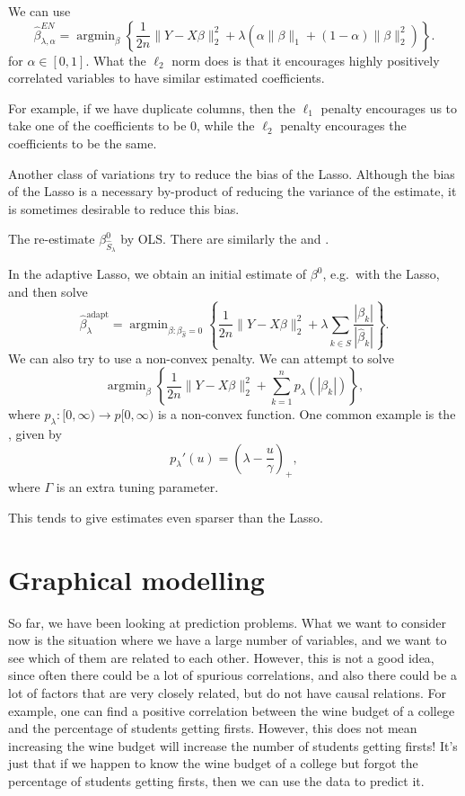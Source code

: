 \documentclass[a4paper]{article}
\DeclareMathOperator*\argmin{argmin}
\begin{document}
\begin{eg}
  We can use
  \[
    \hat{\beta}_{\lambda, \alpha}^{EN} = \argmin_{\beta} \left\{\frac{1}{2n} \|Y - X \beta\|_2^2 + \lambda (\alpha \|\beta\|_1 + (1 - \alpha)\|\beta\|_2^2)\right\}.
  \]
  for $\alpha \in [0, 1]$. What the $\ell_2$ norm does is that it encourages highly positively correlated variables to have similar estimated coefficients.

  For example, if we have duplicate columns, then the $\ell_1$ penalty encourages us to take one of the coefficients to be $0$, while the $\ell_2$ penalty encourages the coefficients to be the same.
\end{eg}

Another class of variations try to reduce the bias of the Lasso. Although the bias of the Lasso is a necessary by-product of reducing the variance of the estimate, it is sometimes desirable to reduce this bias.

The  re-estimate $\beta^0_{\hat{S}_\lambda}$ by OLS. There are similarly the  and .

In the adaptive Lasso, we obtain an initial estimate of $\beta^0$, e.g.\ with the Lasso, and then solve
\[
  \hat{\beta}^{\mathrm{adapt}}_\lambda = \argmin_{\beta : \beta_{\hat{S}} = 0} \left\{\frac{1}{2n} \|Y - X \beta\|_2^2 + \lambda \sum_{k \in \hat{S}} \frac{|\beta_k|}{|\hat{\beta}_k|}\right\}.
\]
We can also try to use a non-convex penalty. We can attempt to solve
\[
  \argmin_\beta \left\{\frac{1}{2n} \|Y - X \beta\|_2^2 + \sum_{k = 1}^n p_\lambda(|\beta_k|)\right\},
\]
where $p_\lambda: [0, \infty) \to p[0, \infty)$ is a non-convex function. One common example is the , given by
\[
  p_\lambda'(u) = \left(\lambda - \frac{u}{\gamma}\right)_+,
\]
where $\Gamma$ is an extra tuning parameter.


This tends to give estimates even sparser than the Lasso.

\section{Graphical modelling}
So far, we have been looking at prediction problems. What we want to consider now is the situation where we have a large number of variables, and we want to see which of them are related to each other. However, this is not a good idea, since often there could be a lot of spurious correlations, and also there could be a lot of factors that are very closely related, but do not have causal relations. For example, one can find a positive correlation between the wine budget of a college and the percentage of students getting firsts. However, this does not mean increasing the wine budget will increase the number of students getting firsts! It's just that if we happen to know the wine budget of a college but forgot the percentage of students getting firsts, then we can use the data to predict it.
\end{document}
